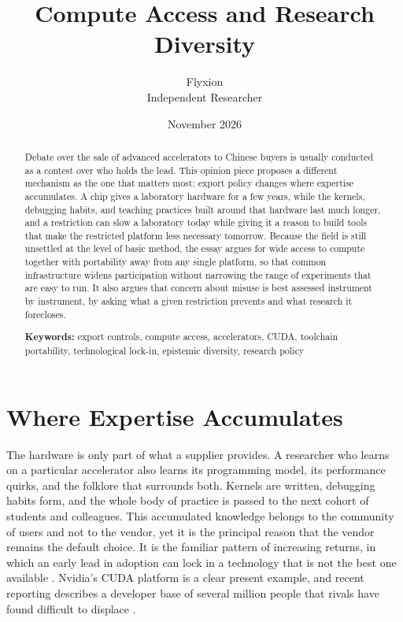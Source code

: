 \documentclass[12pt]{article}
\title{Compute Access and Research Diversity}
\author{Flyxion\\Independent Researcher}
\date{November 2026}
\begin{document}
\maketitle

\begin{abstract}
\noindent Debate over the sale of advanced accelerators to Chinese buyers is usually conducted as a contest over who holds the lead. This opinion piece proposes a different mechanism as the one that matters most: export policy changes where expertise accumulates. A chip gives a laboratory hardware for a few years, while the kernels, debugging habits, and teaching practices built around that hardware last much longer, and a restriction can slow a laboratory today while giving it a reason to build tools that make the restricted platform less necessary tomorrow. Because the field is still unsettled at the level of basic method, the essay argues for wide access to compute together with portability away from any single platform, so that common infrastructure widens participation without narrowing the range of experiments that are easy to run. It also argues that concern about misuse is best assessed instrument by instrument, by asking what a given restriction prevents and what research it forecloses.

\vspace{4.5em}
\noindent\textbf{Keywords:} export controls, compute access, accelerators, CUDA, toolchain portability, technological lock-in, epistemic diversity, research policy
\end{abstract}

\newpage
\fontsize{10}{12}\selectfont

\section{Where Expertise Accumulates}

The hardware is only part of what a supplier provides. A researcher who learns on a particular accelerator also learns its programming model, its performance quirks, and the folklore that surrounds both. Kernels are written, debugging habits form, and the whole body of practice is passed to the next cohort of students and colleagues. This accumulated knowledge belongs to the community of users and not to the vendor, yet it is the principal reason that the vendor remains the default choice. It is the familiar pattern of increasing returns, in which an early lead in adoption can lock in a technology that is not the best one available \cite{david1985, arthur1989}. Nvidia's CUDA platform is a clear present example, and recent reporting describes a developer base of several million people that rivals have found difficult to displace \cite{nextweb2026}.
\end{document}
